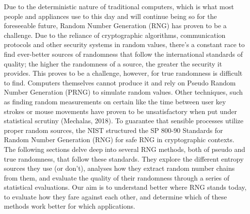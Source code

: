 Due to the deterministic nature of traditional computers, which is what most people and appliances use to this day and will continue being so for the foreseeable future, Random Number Generation (RNG) has proven to be a challenge. Due to the reliance of cryptographic algorithms, communication protocols and other security systems in random values, there’s a constant race to find ever-better sources of randomness that follow the international standards of quality; the higher the randomness of a source, the greater the security it provides. This proves to be a challenge, however, for true randomness is difficult to find. Computers themselves cannot produce it and rely on Pseudo Random Number Generation (PRNG) to simulate random values. Other techniques, such as finding random measurements on certain like the time between user key strokes or mouse movements have proven to be unsatisfactory when put under statistical scrutiny (Mechalas, 2018). 
To guarantee that sensible processes utilize proper random sources, the NIST structured the SP 800-90 Standards for Random Number Generation (RNG) for safe RNG in cryptographic contexts. The following sections delve deep into several RNG methods, both of pseudo and true randomness, that follow these standards. They explore the different entropy sources they use (or don’t), analyses how they extract random number chains from them, and evaluate the quality of their randomness through a series of statistical evaluations. Our aim is to understand better where RNG stands today, to evaluate how they fare against each other, and determine which of these methods work better for which applications.